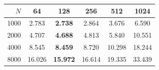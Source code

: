 \begin{tabular}{rccccc}\toprule
$N$ & 64 & 128 & 256 & 512 & 1024 \\ \midrule
1000 & 2.783 & \textbf{2.738} & 2.864 & 3.676 & 6.590 \\ 
2000 & 4.707 & \textbf{4.688} & 4.813 & 5.840 & 10.551 \\ 
4000 & 8.545 & \textbf{8.459} & 8.720 & 10.298 & 18.244 \\ 
8000 & 16.026 & \textbf{15.972} & 16.614 & 19.335 & 33.439 \\ 
\bottomrule\end{tabular}
